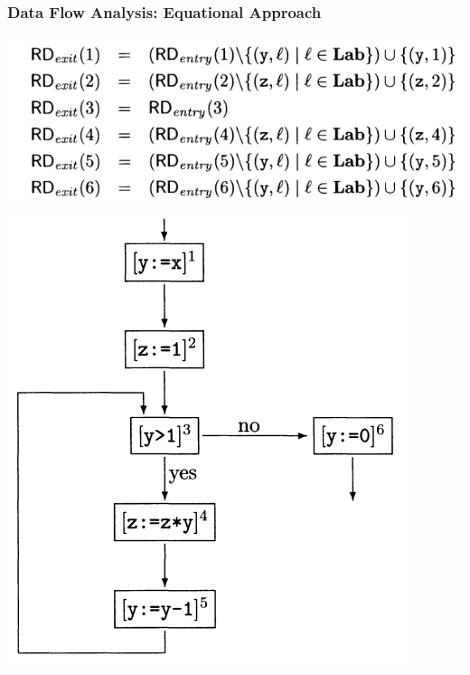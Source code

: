 \documentclass[aspectratio=1610, 13pt]{beamer}
\begin{document}
\begin{frame}\frametitle{Data Flow Analysis: Equational Approach}
\begin{center}

\includegraphics[scale=0.4]{rd_eq1.png}
\includegraphics[scale=0.3]{small_demo.png}
\end{center}


\end{frame}
\end{document}

